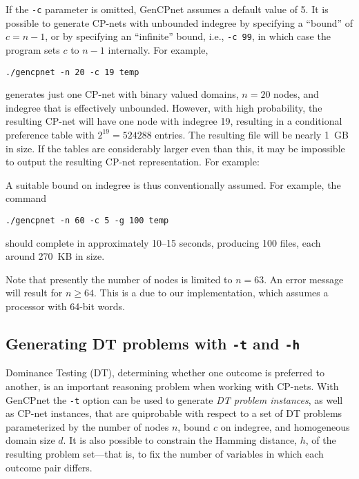 \documentclass{article}
\begin{document}
If the \texttt{-c} parameter is omitted, GenCPnet assumes a default
value of 5.  It is possible to generate CP-nets with unbounded
indegree by specifying a ``bound'' of $c = n-1$, 
or by specifying an ``infinite'' bound, i.e., \texttt{-c 99}, in which
case the program sets $c$ to $n-1$ internally.  For example,
\begin{verbatim}
./gencpnet -n 20 -c 19 temp
\end{verbatim}
generates just one CP-net with binary valued domains, $n=20$ nodes,
and indegree that is effectively unbounded.  However, with high
probability, the resulting CP-net will have one node with indegree 19,
resulting in a conditional preference table with $2^{19} = 524288$
entries.  The resulting file will be nearly 1~GB in size.  If the
tables are considerably larger even than this, it may be impossible to
output the resulting CP-net representation.  For example:
A suitable bound on indegree is thus conventionally assumed.  For example,
the command 
\begin{verbatim}
./gencpnet -n 60 -c 5 -g 100 temp
\end{verbatim}
should complete in approximately 10--15 seconds, producing 100 files,
each around 270~KB in size.

Note that presently the number of nodes is limited to $n=63$.
An error message will result for $n$.  This is a due to our
implementation, which assumes a processor with 64-bit words.  

\subsection{Generating DT problems with \texttt{-t} and \texttt{-h}}

Dominance Testing (DT), determining whether one outcome is preferred
to another, is an important reasoning problem when working with
CP-nets.  With GenCPnet the \texttt{-t} option can be used to generate
\emph{DT problem instances}, as well as CP-net instances, that are
quiprobable with respect to a set of DT problems parameterized by the
number of nodes $n$, bound $c$ on indegree, and homogeneous domain
size $d$.  It is also possible to constrain the Hamming distance, $h$,
of the resulting problem set---that is, to fix the number of variables
in which each outcome pair differs.  
\end{document}
